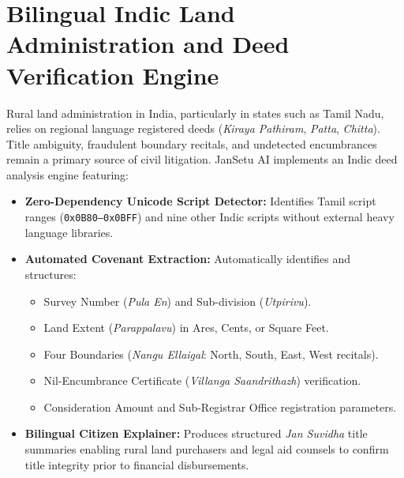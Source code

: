 \documentclass[12pt,a4paper,oneside]{report}
\begin{document}
\section{Bilingual Indic Land Administration and Deed Verification Engine}
Rural land administration in India, particularly in states such as Tamil Nadu, relies on regional language registered deeds (\textit{Kiraya Pathiram}, \textit{Patta}, \textit{Chitta}). Title ambiguity, fraudulent boundary recitals, and undetected encumbrances remain a primary source of civil litigation. JanSetu AI implements an Indic deed analysis engine featuring:
\begin{itemize}[itemsep=2pt]
    \item \textbf{Zero-Dependency Unicode Script Detector:} Identifies Tamil script ranges (\texttt{0x0B80--0x0BFF}) and nine other Indic scripts without external heavy language libraries.
    \item \textbf{Automated Covenant Extraction:} Automatically identifies and structures:
    \begin{itemize}[itemsep=1pt]
        \item Survey Number (\textit{Pula En}) and Sub-division (\textit{Utpirivu}).
        \item Land Extent (\textit{Parappalavu}) in Ares, Cents, or Square Feet.
        \item Four Boundaries (\textit{Nangu Ellaigal}: North, South, East, West recitals).
        \item Nil-Encumbrance Certificate (\textit{Villanga Saandrithazh}) verification.
        \item Consideration Amount and Sub-Registrar Office registration parameters.
    \end{itemize}
    \item \textbf{Bilingual Citizen Explainer:} Produces structured \textit{Jan Suvidha} title summaries enabling rural land purchasers and legal aid counsels to confirm title integrity prior to financial disbursements.
\end{itemize}
\end{document}
